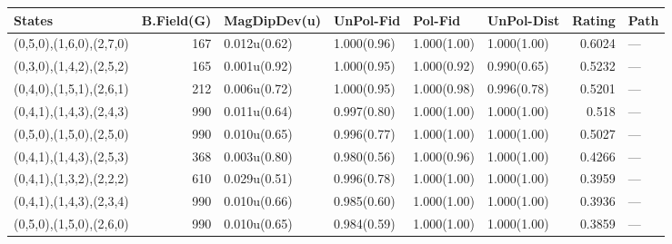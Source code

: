 \begin{tabular}{lrllllrl}
\hline
 States                  &   B.Field(G) & MagDipDev(u)   & UnPol-Fid   & Pol-Fid     & UnPol-Dist   &   Rating & Path   \\
\hline
 (0,5,0),(1,6,0),(2,7,0) &          167 & 0.012u(0.62)   & 1.000(0.96) & 1.000(1.00) & 1.000(1.00)  &   0.6024 & ---    \\
 (0,3,0),(1,4,2),(2,5,2) &          165 & 0.001u(0.92)   & 1.000(0.95) & 1.000(0.92) & 0.990(0.65)  &   0.5232 & ---    \\
 (0,4,0),(1,5,1),(2,6,1) &          212 & 0.006u(0.72)   & 1.000(0.95) & 1.000(0.98) & 0.996(0.78)  &   0.5201 & ---    \\
 (0,4,1),(1,4,3),(2,4,3) &          990 & 0.011u(0.64)   & 0.997(0.80) & 1.000(1.00) & 1.000(1.00)  &   0.518  & ---    \\
 (0,5,0),(1,5,0),(2,5,0) &          990 & 0.010u(0.65)   & 0.996(0.77) & 1.000(1.00) & 1.000(1.00)  &   0.5027 & ---    \\
 (0,4,1),(1,4,3),(2,5,3) &          368 & 0.003u(0.80)   & 0.980(0.56) & 1.000(0.96) & 1.000(1.00)  &   0.4266 & ---    \\
 (0,4,1),(1,3,2),(2,2,2) &          610 & 0.029u(0.51)   & 0.996(0.78) & 1.000(1.00) & 1.000(1.00)  &   0.3959 & ---    \\
 (0,4,1),(1,4,3),(2,3,4) &          990 & 0.010u(0.66)   & 0.985(0.60) & 1.000(1.00) & 1.000(1.00)  &   0.3936 & ---    \\
 (0,5,0),(1,5,0),(2,6,0) &          990 & 0.010u(0.65)   & 0.984(0.59) & 1.000(1.00) & 1.000(1.00)  &   0.3859 & ---    \\
\hline
\end{tabular}